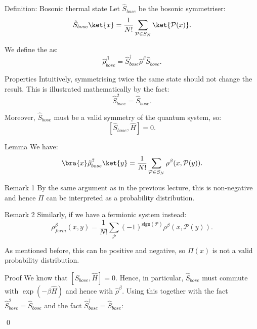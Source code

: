 \documentclass[a4paper]{article}
\begin{document}
\begin{parag}{Definition: Bosonic thermal state}
    Let $\hat{S}_{bose}$ be the bosonic symmetriser: 
    \[\hat{S}_{bose} \ket{x} = \frac{1}{N!} \sum_{\mathcal{P} \in S_N} \ket{\mathcal{P}\left(x\right)}.\]

    We define the  as: 
    \[\hat{\rho}^{\beta}_{bose} = \hat{S}_{bose}^{\dagger} \hat{\rho}^{\beta} \hat{S}_{bose}.\]
    
    \begin{subparag}{Properties}
        Intuitively, symmetrising twice the same state should not change the result. This is illustrated mathematically by the fact: 
        \[\hat{S}_{bose}^2 = \hat{S}_{bose}.\]
        
        Moreover, $\hat{S}_{bose}$ must be a valid symmetry of the quantum system, so:
        \[\left[\hat{S}_{bose}, \hat{H}\right] = 0.\]
    \end{subparag}
\end{parag}

\begin{parag}{Lemma}
    We have: 
    \[\bra{x} \hat{\rho}^{\beta}_{bose} \ket{y} = \frac{1}{N!} \sum_{\mathcal{P} \in S_N} \rho^{\beta}\left(x, \mathcal{P}\left(y\right)\right).\]

    \begin{subparag}{Remark 1}
        By the same argument as in the previous lecture, this is non-negative and hence $\Pi$ can be interpreted as a probability distribution.
    \end{subparag}

    \begin{subparag}{Remark 2}
        Similarly, if we have a fermionic system instead:
        \[\rho_{ferm}^{\beta}\left(x, y\right) = \frac{1}{N!} \sum_{\mathcal{P}} \left(-1\right)^{\text{sign}\left(\mathcal{P}\right)} \rho^{\beta}\left(x, \mathcal{P}\left(y\right)\right).\]

        As mentioned before, this can be positive and negative, so $\Pi\left(x\right)$ is not a valid probability distribution. 
    \end{subparag}
    
    \begin{subparag}{Proof}
        We know that $\left[\hat{S}_{bose}, \hat{H}\right] = 0$. Hence, in particular, $\hat{S}_{bose}$ must commute with $\exp\left(-\beta \hat{H}\right)$ and hence with $\hat{\rho}^{\beta}$. Using this together with the fact $\hat{S}_{bose}^2 = \hat{S}_{bose}$ and the fact $\hat{S}_{bose}^{\dagger} = \hat{S}_{bose}$: 
        
        \qed
    \end{subparag}
\end{parag}
\end{document}
